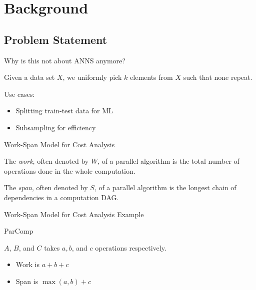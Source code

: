 \section{Background}

\subsection{Problem Statement}

\begin{frame}{}
  \begin{center}
    Why is this not about ANNS anymore?
  \end{center}
\end{frame}

\begin{frame}{}
  \begin{definition}
    Given a data set \(X\), we uniformly pick \(k\) elements
    from \(X\) such that none repeat.
  \end{definition}

  Use cases:
  \begin{itemize}
    \item Splitting train-test data for ML 
    \item Subsampling for efficiency
  \end{itemize}
\end{frame}

\begin{frame}{Work-Span Model for Cost Analysis}
  \begin{definition}[Work]
    The \textit{work}, often denoted by \(W\), of a parallel algorithm is the 
    total number of operations done in the whole computation.
  \end{definition}

  \begin{definition}[Span]
    The \textit{span}, often denoted by \(S\), of a parallel algorithm is the
    longest chain of dependencies in a computation DAG.
  \end{definition}
\end{frame}

\begin{frame}{Work-Span Model for Cost Analysis Example}
  \begin{algorithm}[H]
    \caption{ParComp}
    \begin{algorithmic}
    \end{algorithmic}
  \end{algorithm}
  
  \(A\), \(B\), and \(C\) takes \(a, b\), and \(c\) operations respectively.
  \begin{itemize}
    \item Work is \(a + b + c\)
    \item Span is \(\max(a, b) + c\)
  \end{itemize}
\end{frame}


